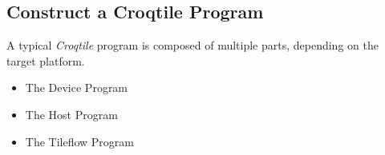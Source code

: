\subsection*{Construct a Croqtile Program}

A typical \emph{Croqtile} program is composed of multiple parts, depending on the target platform.

\begin{itemize}[leftmargin=1.6em]
\item The Device Program
\item The Host Program
\item The Tileflow Program
\end{itemize}
